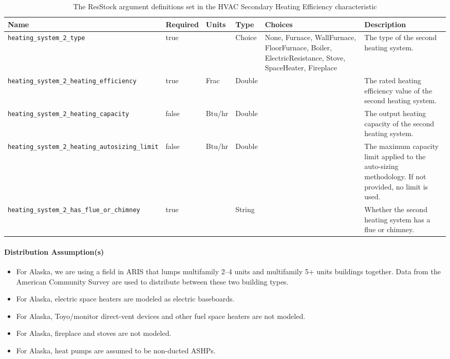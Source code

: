\begin{longtable}[]{|p{3.5cm}|p{1.5cm}|p{1.3cm}|p{1.1cm}|p{}|p{3.3cm}|}\caption{The ResStock argument definitions set in the HVAC Secondary Heating Efficiency characteristic} \label{table:hc_arg_def_hvac_sec_eff} \\
\toprule\noalign{}
Name & Required & Units & Type & Choices & Description \\
\midrule\noalign{}
\endhead
\bottomrule\noalign{}
\endlastfoot
\texttt{heating\_system\_2\_type} & true & & Choice & None, Furnace,
WallFurnace, FloorFurnace, Boiler, ElectricResistance, Stove,
SpaceHeater, Fireplace & The type of the second heating system. \\
\hline
\texttt{heating\_system\_2\_heating\_efficiency} & true & Frac & Double
& & The rated heating efficiency value of the second heating system. \\
\hline
\texttt{heating\_system\_2\_heating\_capacity} & false & Btu/hr & Double
& & The output heating capacity of the second heating system. \\
\hline
\texttt{heating\_system\_2\_heating\_autosizing\_limit} & false & Btu/hr
& Double & & The maximum capacity limit applied to the auto-sizing
methodology. If not provided, no limit is used. \\
\hline
\texttt{heating\_system\_2\_has\_flue\_or\_chimney} & true & & String &
& Whether the second heating system has a flue or chimney. \\
\end{longtable}

\paragraph{Distribution Assumption(s)}
\begin{itemize}
    \item For Alaska, we are using a field in ARIS that lumps multifamily 2--4 units and multifamily 5+ units buildings together. Data from the American Community Survey are used to distribute between these two building types.
    \item For Alaska, electric space heaters are modeled as electric baseboards.
    \item For Alaska, Toyo/monitor direct-vent devices and other fuel space heaters are not modeled.
    \item For Alaska, fireplace and stoves are not modeled.
    \item For Alaska, heat pumps are assumed to be non-ducted ASHPs.
\end{itemize}

